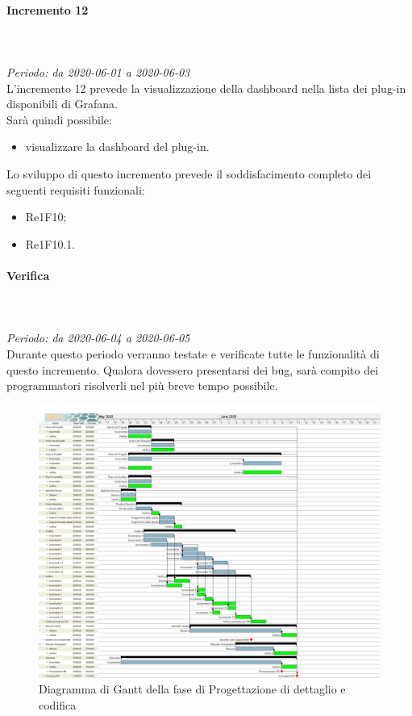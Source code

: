 \paragraph{Incremento 12}\mbox{} \\ \mbox{} \\ 
\textit{Periodo: da 2020-06-01 a 2020-06-03}\\
L’incremento 12 prevede la visualizzazione della dashboard nella lista dei plug-in disponibili di Grafana. \\
Sarà quindi possibile:
\begin{itemize}
	\item visualizzare la dashboard del plug-in.
\end{itemize}
Lo sviluppo di questo incremento prevede il soddisfacimento completo dei seguenti requisiti funzionali:
\begin{itemize}
\item Re1F10;
\item Re1F10.1.
\end{itemize}
\paragraph*{Verifica}\mbox{} \\ \mbox{} \\ 
\textit{Periodo: da 2020-06-04 a 2020-06-05}\\
Durante questo periodo verranno testate e verificate tutte le funzionalità di questo incremento. Qualora dovessero presentarsi dei bug, sarà compito dei programmatori risolverli nel più breve tempo possibile.

\begin{figure}[H]
\centering
\includegraphics[scale=0.24]{./img/gantt/progettazione_dettaglio_codifica.png}
\caption{Diagramma di Gantt della fase di Progettazione di dettaglio e codifica}
\end{figure}

